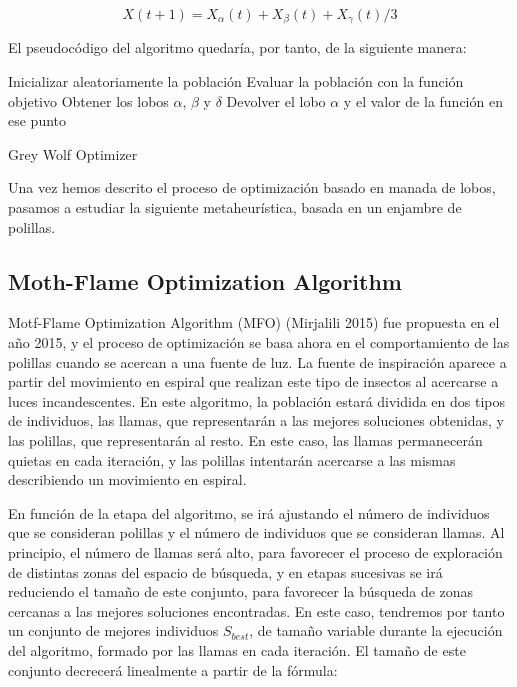 \documentclass[
  a4paper,
,tablecaptionabove
]{scrartcl}
\begin{document}
\[ X(t+1) = X_{\alpha}(t) + X_{\beta}(t) + X_{\gamma}(t) / 3 \]

El pseudocódigo del algoritmo quedaría, por tanto, de la siguiente
manera:

\begin{algorithm}[H]
\DontPrintSemicolon
\SetAlgoLined

\BlankLine
    Inicializar aleatoriamente la población\;
    Evaluar la población con la función objetivo\;
    Obtener los lobos $\alpha$, $\beta$ y $\delta$\;
    Devolver el lobo $\alpha$ y el valor de la función en ese punto
\caption{Grey Wolf Optimizer}
\end{algorithm}

Una vez hemos descrito el proceso de optimización basado en manada de
lobos, pasamos a estudiar la siguiente metaheurística, basada en un
enjambre de polillas.

\hypertarget{moth-flame-optimization-algorithm}{%
\subsection{Moth-Flame Optimization
Algorithm}\label{moth-flame-optimization-algorithm}}

Motf-Flame Optimization Algorithm (MFO) (Mirjalili 2015) fue propuesta
en el año 2015, y el proceso de optimización se basa ahora en el
comportamiento de las polillas cuando se acercan a una fuente de luz. La
fuente de inspiración aparece a partir del movimiento en espiral que
realizan este tipo de insectos al acercarse a luces incandescentes. En
este algoritmo, la población estará dividida en dos tipos de individuos,
las llamas, que representarán a las mejores soluciones obtenidas, y las
polillas, que representarán al resto. En este caso, las llamas
permanecerán quietas en cada iteración, y las polillas intentarán
acercarse a las mismas describiendo un movimiento en espiral.

En función de la etapa del algoritmo, se irá ajustando el número de
individuos que se consideran polillas y el número de individuos que se
consideran llamas. Al principio, el número de llamas será alto, para
favorecer el proceso de exploración de distintas zonas del espacio de
búsqueda, y en etapas sucesivas se irá reduciendo el tamaño de este
conjunto, para favorecer la búsqueda de zonas cercanas a las mejores
soluciones encontradas. En este caso, tendremos por tanto un conjunto de
mejores individuos \(S_{best}\), de tamaño variable durante la ejecución
del algoritmo, formado por las llamas en cada iteración. El tamaño de
este conjunto decrecerá linealmente a partir de la fórmula:
\end{document}
